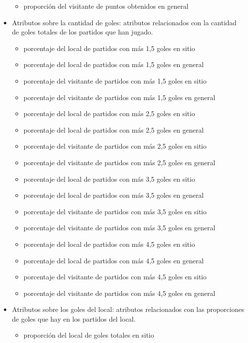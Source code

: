 \begin{itemize}
\begin{itemize}
        \item proporción del visitante de puntos obtenidos en general
    \end{itemize}
    \item Atributos sobre la cantidad de goles: atributos relacionados con la cantidad de goles totales de los partidos que han jugado.
    \begin{itemize}
        \item porcentaje del local de partidos con más 1,5 goles en sitio
        \item porcentaje del local de partidos con más 1,5 goles en general
        \item porcentaje del visitante de partidos con más 1,5 goles en sitio
        \item porcentaje del visitante de partidos con más 1,5 goles en general
        \item porcentaje del local de partidos con más 2,5 goles en sitio
        \item porcentaje del local de partidos con más 2,5 goles en general
        \item porcentaje del visitante de partidos con más 2,5 goles en sitio
        \item porcentaje del visitante de partidos con más 2,5 goles en general
        \item porcentaje del local de partidos con más 3,5 goles en sitio
        \item porcentaje del local de partidos con más 3,5 goles en general
        \item porcentaje del visitante de partidos con más 3,5 goles en sitio
        \item porcentaje del visitante de partidos con más 3,5 goles en general
        \item porcentaje del local de partidos con más 4,5 goles en sitio
        \item porcentaje del local de partidos con más 4,5 goles en general
        \item porcentaje del visitante de partidos con más 4,5 goles en sitio
        \item porcentaje del visitante de partidos con más 4,5 goles en general
    \end{itemize}
    \item Atributos sobre los goles del local: atributos relacionados con las proporciones de goles que hay en los partidos del local.
    \begin{itemize}
        \item proporción del local de goles totales en sitio

\end{itemize}
\end{itemize}
